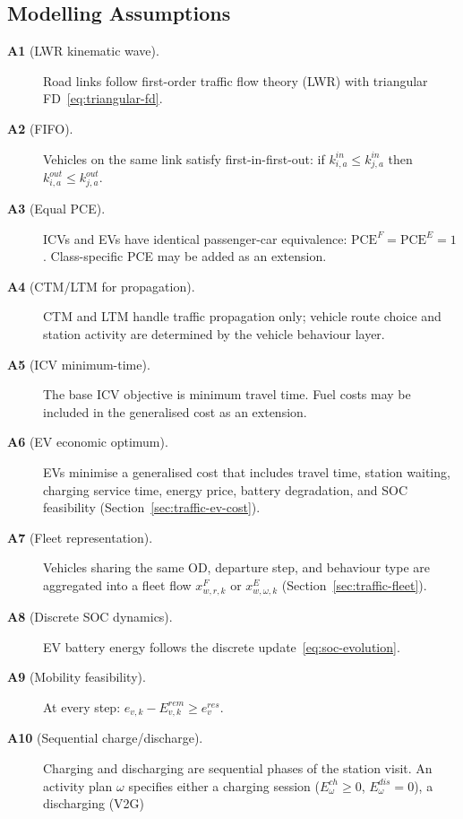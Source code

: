 \subsection{Modelling Assumptions}
\label{sec:traffic-assumptions}

\begin{description}
  \item[\textbf{A1} (LWR kinematic wave).] Road links follow first-order
    traffic flow theory (LWR) with triangular FD~\eqref{eq:triangular-fd}.
  \item[\textbf{A2} (FIFO).] Vehicles on the same link satisfy
    first-in-first-out: if $k^{in}_{i,a} \le k^{in}_{j,a}$ then
    $k^{out}_{i,a} \le k^{out}_{j,a}$.
  \item[\textbf{A3} (Equal PCE).] ICVs and EVs have identical
    passenger-car equivalence: $\mathrm{PCE}^F = \mathrm{PCE}^E = 1$.
    Class-specific PCE may be added as an extension.
  \item[\textbf{A4} (CTM/LTM for propagation).] CTM and LTM handle
    traffic propagation only; vehicle route choice and station activity
    are determined by the vehicle behaviour layer.
  \item[\textbf{A5} (ICV minimum-time).] The base ICV objective is
    minimum travel time.  Fuel costs may be included in the generalised
    cost as an extension.
  \item[\textbf{A6} (EV economic optimum).] EVs minimise a generalised
    cost that includes travel time, station waiting, charging service
    time, energy price, battery degradation, and SOC feasibility
    (Section~\ref{sec:traffic-ev-cost}).
  \item[\textbf{A7} (Fleet representation).] Vehicles sharing the same
    OD, departure step, and behaviour type are aggregated into a fleet
    flow $x^F_{w,r,k}$ or $x^E_{w,\omega,k}$ (Section~\ref{sec:traffic-fleet}).
  \item[\textbf{A8} (Discrete SOC dynamics).] EV battery energy follows
    the discrete update~\eqref{eq:soc-evolution}.
  \item[\textbf{A9} (Mobility feasibility).] At every step:
    $e_{v,k} - E^{rem}_{v,k} \ge e^{res}_v$.
  \item[\textbf{A10} (Sequential charge/discharge).] Charging and
    discharging are sequential phases of the station visit.
    An activity plan $\omega$ specifies either a charging session
    ($E^{ch}_\omega \ge 0$, $E^{dis}_\omega = 0$), a discharging (V2G)

\end{description}

